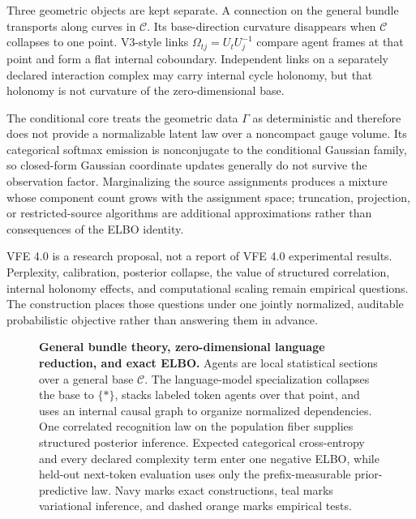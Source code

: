 Three geometric objects are kept separate. A connection on the general bundle transports along curves in \(\mathcal C\). Its base-direction curvature disappears when \(\mathcal C\) collapses to one point. V3-style links \(\Omega_{tj}=U_tU_j^{-1}\) compare agent frames at that point and form a flat internal coboundary. Independent links on a separately declared interaction complex may carry internal cycle holonomy, but that holonomy is not curvature of the zero-dimensional base.

The conditional core treats the geometric data \(\Gamma\) as deterministic and therefore does not provide a normalizable latent law over a noncompact gauge volume. Its categorical softmax emission is nonconjugate to the conditional Gaussian family, so closed-form Gaussian coordinate updates generally do not survive the observation factor. Marginalizing the source assignments produces a mixture whose component count grows with the assignment space; truncation, projection, or restricted-source algorithms are additional approximations rather than consequences of the ELBO identity.

VFE 4.0 is a research proposal, not a report of VFE 4.0 experimental results. Perplexity, calibration, posterior collapse, the value of structured correlation, internal holonomy effects, and computational scaling remain empirical questions. The construction places those questions under one jointly normalized, auditable probabilistic objective rather than answering them in advance.

\usetikzlibrary{arrows.meta, backgrounds, calc, fit, positioning, shapes.geometric}
\begin{figure}[htbp]
\centering
\resizebox{\textwidth}{!}{}
\caption{%
\textbf{General bundle theory, zero-dimensional language reduction, and exact ELBO.}
Agents are local statistical sections over a general base \(\mathcal C\). The language-model specialization collapses the base to \(\{\ast\}\), stacks labeled token agents over that point, and uses an internal causal graph to organize normalized dependencies. One correlated recognition law on the population fiber supplies structured posterior inference. Expected categorical cross-entropy and every declared complexity term enter one negative ELBO, while held-out next-token evaluation uses only the prefix-measurable prior-predictive law. Navy marks exact constructions, teal marks variational inference, and dashed orange marks empirical tests.
}
\label{fig:vfe4-graphical-abstract}
\end{figure}

